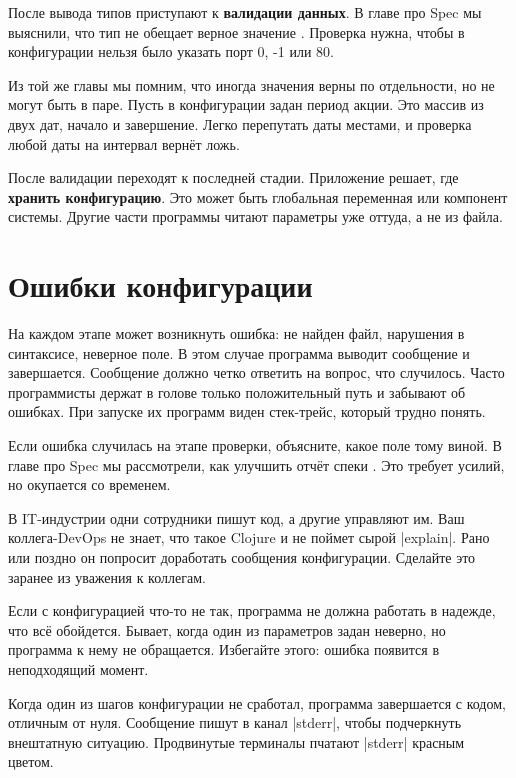 
После вывода типов приступают к \textbf{валидации данных}. В главе про Spec мы
выяснили, что тип не обещает верное значение .
Проверка нужна, чтобы в конфигурации нельзя было указать порт 0, -1 или 80.

Из той же главы мы помним, что иногда значения верны по отдельности, но не могут
быть в паре. Пусть в конфигурации задан период акции. Это массив из двух дат,
начало и завершение. Легко перепутать даты местами, и проверка любой даты
на интервал верн\"{е}т ложь.

После валидации переходят к последней стадии. Приложение решает, где
\textbf{хранить конфигурацию}. Это может быть глобальная переменная или
компонент системы. Другие части программы читают параметры уже оттуда, а не из
файла.

\section{Ошибки конфигурации}


На каждом этапе может возникнуть ошибка: не найден файл, нарушения в синтаксисе,
неверное поле. В этом случае программа выводит сообщение и завершается.
Сообщение должно четко ответить на вопрос, что случилось. Часто программисты
держат в голове только положительный путь и забывают об ошибках. При запуске
их программ виден стек-трейс, который трудно понять.

Если ошибка случилась на этапе проверки, объясните, какое поле тому виной. В
главе про Spec мы рассмотрели, как улучшить отч\"{е}т спеки .
Это требует усилий, но окупается со временем.


В IT-индустрии одни сотрудники пишут код, а другие управляют им. Ваш
коллега-DevOps не знает, что такое Clojure и не поймет сырой
\spverb|explain|. Рано или поздно он попросит доработать сообщения
конфигурации. Сделайте это заранее из уважения к коллегам.

Если с конфигурацией что-то не так, программа не должна работать в надежде, что
вс\"{е} обойдется. Бывает, когда один из параметров задан неверно, но программа к
нему не обращается. Избегайте этого: ошибка появится в неподходящий
момент.


Когда один из шагов конфигурации не сработал, программа завершается с кодом,
отличным от нуля. Сообщение пишут в канал \spverb|stderr|, чтобы подчеркнуть
внештатную ситуацию. Продвинутые терминалы пчатают \spverb|stderr| красным
цветом.

